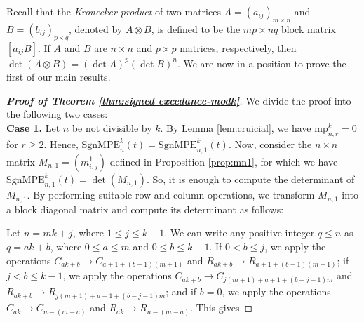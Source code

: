 \documentclass[12pt]{article}
\newcommand{\SMPE}{\mathrm{SgnMPE}}
\newcommand{\mpa}{\mathrm{mp}}
\begin{document}
Recall that the \textit{Kronecker product} of two matrices $A=(a_{ij})_{m\times n}$ and $B=(b_{ij})_{p\times q}$, denoted by $A\otimes B$, is defined to be the $mp\times nq$ block matrix $[a_{ij}B]$. If $A$ and $B$ are $n \times n$ and $p\times p$ matrices, respectively, then $\det(A\otimes B)=(\det A)^p(\det B)^n$. We are now in a position to prove the first of our main results. 


\begin{proof}
[\textbf{Proof of Theorem \ref{thm:signed excedance-modk}}]
We divide the proof into the following two cases:\\
\textbf{Case 1.} Let $n$ be not divisible by $k$. By Lemma \ref{lem:cruicial}, we have $\mpa_{n,r}^k=0$ for $r \geq 2$. Hence, $\SMPE_n^k(t)= \SMPE_{n,1}^k(t)$. Now, consider the  $n \times n$ matrix $M_{n,1}= (m^1_{i,j})$ defined in Proposition \ref{prop:mn1}, for which we have $\SMPE_{n,1}^k(t)=\det(M_{n,1})$. So, it is enough to compute the determinant of $M_{n,1}.$ By performing suitable row and column operations, we transform $M_{n,1}$ into a block diagonal matrix and compute its determinant as follows: 

Let $n=mk+j$, where $1 \leq j \leq k-1.$ We can write any positive integer $q \leq n$ as $q=ak+b$, where $0 \leq a \leq m$ and $ 0 \leq b \leq k-1$. If $0 < b \leq j$, we apply the operations $C_{ak+b}\rightarrow C_{a+1+(b-1)(m+1)}$ and $R_{ak+b}\rightarrow R_{a+1+(b-1)(m+1)}$; if $j < b \leq k-1$, we apply the operations $C_{ak+b}\rightarrow C_{j(m+1)+a+1+(b-j-1)m}$ and $R_{ak+b}\rightarrow R_{j(m+1)+a+1+(b-j-1)m}$; and if $b=0$, we apply the operations $C_{ak}\rightarrow C_{n-(m-a)}$ and $R_{ak}\rightarrow R_{n-(m-a)}$. This gives


\end{proof}
\end{document}
